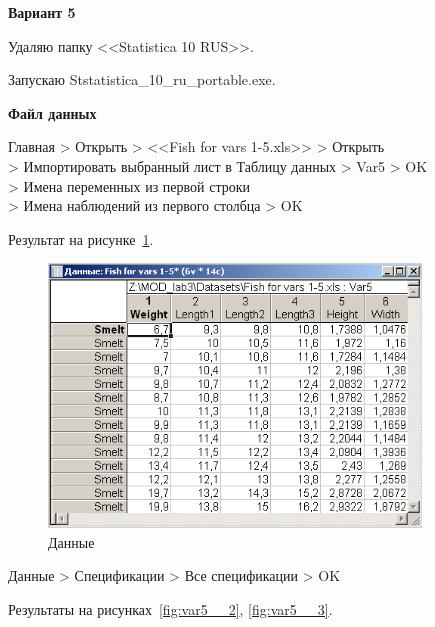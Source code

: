 \newpage

\begin{center}
  \textbf{Вариант 5}
\end{center}

Удаляю папку <<Statistica 10 RUS>>.

Запускаю Ststatistica\_10\_ru\_portable.exe.

\begin{center}
  \textbf{Файл данных}
\end{center}

Главная > Открыть > <<Fish for vars 1-5.xls>> > Открыть \\
> Импортировать выбранный лист в Таблицу данных > Var5 > OK \\
> Имена переменных из первой строки\\
> Имена наблюдений из первого столбца > OK

Результат на рисунке~\ref{fig:var5__1}.

\begin{figure}[!h]
  \centering

  \includegraphics[height=7cm]
  {inc/var5__1.PNG}

  \caption{Данные}

  \label{fig:var5__1}
\end{figure}

Данные > Спецификации > Все спецификации > OK 

Результаты на рисунках~\ref{fig:var5__2}, \ref{fig:var5__3}.

